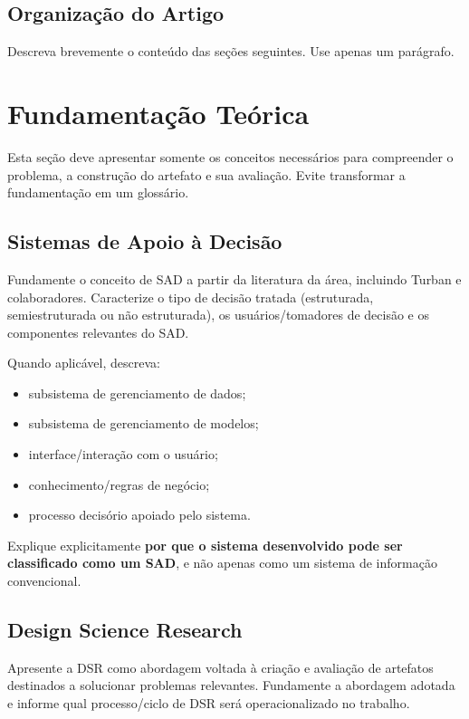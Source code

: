\documentclass[12pt]{article}
\begin{document}
\subsection{Organização do Artigo}

Descreva brevemente o conteúdo das seções seguintes. Use apenas um parágrafo.

\section{Fundamentação Teórica}
\label{sec:fundamentacao}

Esta seção deve apresentar somente os conceitos necessários para compreender o problema, a construção do artefato e sua avaliação. Evite transformar a fundamentação em um glossário.

\subsection{Sistemas de Apoio à Decisão}

Fundamente o conceito de SAD a partir da literatura da área, incluindo Turban e colaboradores. Caracterize o tipo de decisão tratada (estruturada, semiestruturada ou não estruturada), os usuários/tomadores de decisão e os componentes relevantes do SAD.

Quando aplicável, descreva:
\begin{itemize}[noitemsep]
    \item subsistema de gerenciamento de dados;
    \item subsistema de gerenciamento de modelos;
    \item interface/interação com o usuário;
    \item conhecimento/regras de negócio;
    \item processo decisório apoiado pelo sistema.
\end{itemize}

Explique explicitamente \textbf{por que o sistema desenvolvido pode ser classificado como um SAD}, e não apenas como um sistema de informação convencional.

\subsection{Design Science Research}

Apresente a DSR como abordagem voltada à criação e avaliação de artefatos destinados a solucionar problemas relevantes. Fundamente a abordagem adotada e informe qual processo/ciclo de DSR será operacionalizado no trabalho.
\end{document}
